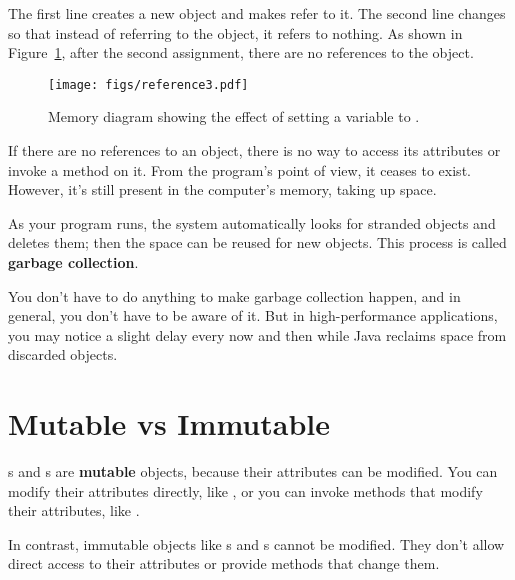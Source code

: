 The first line creates a new  object and makes  refer to it.
The second line changes  so that instead of referring to the object, it refers to nothing.
As shown in Figure~\ref{fig.reference3}, after the second assignment, there are no references to the  object.


\begin{figure}[!ht]
\begin{center}
\texttt{[image: figs/reference3.pdf]}
\caption{Memory diagram showing the effect of setting a variable to .}
\label{fig.reference3}
\end{center}
\end{figure}

If there are no references to an object, there is no way to access its attributes or invoke a method on it.
From the program's point of view, it ceases to exist.
However, it's still present in the computer's memory, taking up space.


As your program runs, the system automatically looks for stranded objects and deletes them; then the space can be reused for new objects.
This process is called {\bf garbage collection}.

You don't have to do anything to make garbage collection happen, and in general, you don't have to be aware of it.
But in high-performance applications, you may notice a slight delay every now and then while Java reclaims space from discarded objects.


\section{Mutable vs Immutable}
\label{mutable-objects_mutable-vs-immutable}


s and s are {\bf mutable} objects, because their attributes can be modified.
You can modify their attributes directly, like , or you can invoke methods that modify their attributes, like .

In contrast, immutable objects like s and s cannot be modified.
They don't allow direct access to their attributes or provide methods that change them.

